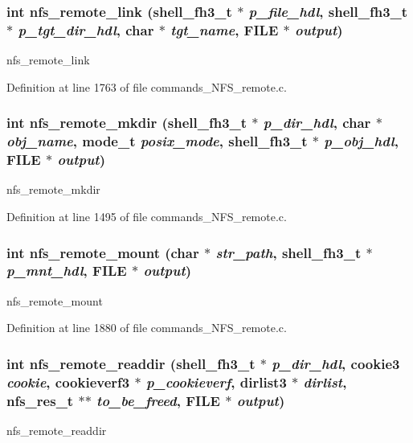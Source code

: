 \subsubsection[{nfs\_\-remote\_\-link}]{\setlength{\rightskip}{0pt plus 5cm}int nfs\_\-remote\_\-link ({\bf shell\_\-fh3\_\-t} $\ast$ {\em p\_\-file\_\-hdl}, \/  {\bf shell\_\-fh3\_\-t} $\ast$ {\em p\_\-tgt\_\-dir\_\-hdl}, \/  char $\ast$ {\em tgt\_\-name}, \/  FILE $\ast$ {\em output})}\label{commands__NFS__remote_8c_abb1887d7a1e37944f0fdffe3877a6a6d}
nfs\_\-remote\_\-link 

Definition at line 1763 of file commands\_\-NFS\_\-remote.c.
\subsubsection[{nfs\_\-remote\_\-mkdir}]{\setlength{\rightskip}{0pt plus 5cm}int nfs\_\-remote\_\-mkdir ({\bf shell\_\-fh3\_\-t} $\ast$ {\em p\_\-dir\_\-hdl}, \/  char $\ast$ {\em obj\_\-name}, \/  mode\_\-t {\em posix\_\-mode}, \/  {\bf shell\_\-fh3\_\-t} $\ast$ {\em p\_\-obj\_\-hdl}, \/  FILE $\ast$ {\em output})}\label{commands__NFS__remote_8c_a36f734ba36ffccc1e741e6ffd8e6573e}
nfs\_\-remote\_\-mkdir 

Definition at line 1495 of file commands\_\-NFS\_\-remote.c.
\subsubsection[{nfs\_\-remote\_\-mount}]{\setlength{\rightskip}{0pt plus 5cm}int nfs\_\-remote\_\-mount (char $\ast$ {\em str\_\-path}, \/  {\bf shell\_\-fh3\_\-t} $\ast$ {\em p\_\-mnt\_\-hdl}, \/  FILE $\ast$ {\em output})}\label{commands__NFS__remote_8c_a7eb0220c01214de19ba46e2800f93f58}
nfs\_\-remote\_\-mount 

Definition at line 1880 of file commands\_\-NFS\_\-remote.c.
\subsubsection[{nfs\_\-remote\_\-readdir}]{\setlength{\rightskip}{0pt plus 5cm}int nfs\_\-remote\_\-readdir ({\bf shell\_\-fh3\_\-t} $\ast$ {\em p\_\-dir\_\-hdl}, \/  cookie3 {\em cookie}, \/  cookieverf3 $\ast$ {\em p\_\-cookieverf}, \/  dirlist3 $\ast$ {\em dirlist}, \/  nfs\_\-res\_\-t $\ast$$\ast$ {\em to\_\-be\_\-freed}, \/  FILE $\ast$ {\em output})}\label{commands__NFS__remote_8c_a61b358c4ec7ddad456f18ca5906c51b6}
nfs\_\-remote\_\-readdir 

